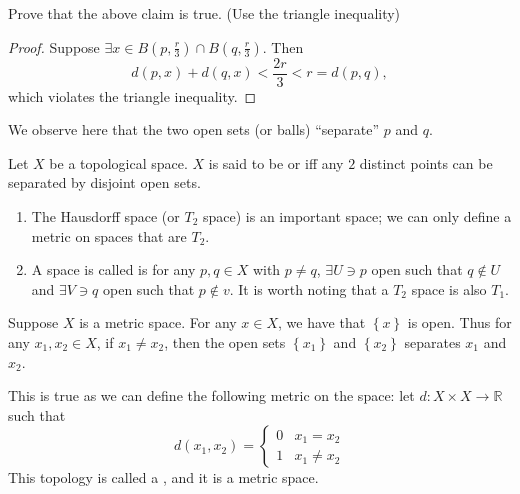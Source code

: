 \documentclass[notoc,notitlepage]{tufte-book}
\begin{document}
\begin{ex}
  Prove that the above claim is true. (Use the triangle inequality)
\end{ex}

\begin{proof}
  Suppose $\exists x \in B \left( p, \frac{r}{3} \right) \cap B \left( q, \frac{r}{3} \right)$.
  Then
  \begin{equation*}
    d(p, x) + d(q, x) < \frac{2r}{3} < r = d(p, q),
  \end{equation*}
  which violates the triangle inequality.
\end{proof}

We observe here that the two open sets (or balls) ``separate'' $p$ and $q$.

\begin{defn}[Hausdorff / $T_2$]\label{defn:hausdorff_t_2_}
  Let $X$ be a topological space. $X$ is said to be  or 
  iff any $2$ distinct points can be separated by disjoint open sets.
\end{defn}

\begin{note}
  \begin{enumerate}
    \item The Hausdorff space (or $T_2$ space) is an important space;
      we can only define a metric on spaces that are $T_2$.
    \item A space is called  is for any $p, q \in X$ with $p \neq q$,
      $\exists U \ni p$ open such that $q \notin U$ and $\exists V \ni q$ open
      such that $p \notin v$. It is worth noting that a $T_2$ space is also
      $T_1$.
  \end{enumerate}
\end{note}

\begin{eg}
  Suppose $X$ is a metric space. For any $x \in X$, we have that $\left\{ x \right\}$ is open.
  Thus for any $x_1, x_2 \in X$, if $x_1 \neq x_2$, then the open sets
  $\left\{ x_1 \right\}$ and $\left\{ x_2 \right\}$ separates $x_1$ and $x_2$.

  This is true as we can define the following metric on the space:
  let $d : X \times X \to \mathbb{R}$ such that
  \begin{equation*}
    d(x_1, x_2) = \begin{cases}
      0 & x_1 = x_2 \\
      1 & x_1 \neq x_2
    \end{cases}
  \end{equation*}
  This topology is called a , and it is a metric space.
\end{eg}
\end{document}
